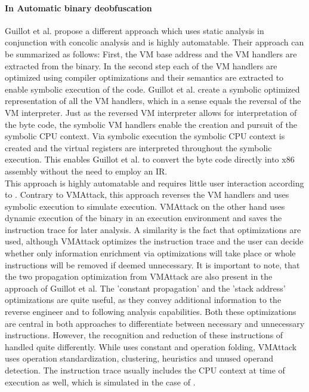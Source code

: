 \documentclass[10pt,twoside,a4paper,bibliography=totoc]{scrbook}
\begin{document}
\paragraph*{In Automatic binary deobfuscation} Guillot et al. propose a different approach which uses static analysis in conjunction with concolic analysis and is highly automatable.
Their approach can be summarized as follows: First, the VM base address and the VM handlers are extracted from the binary. 
In the second step each of the VM handlers are optimized using compiler optimizations and their semantics are extracted to enable symbolic execution of the code. 
Guillot et al. create a symbolic optimized representation of all the VM handlers, which in a sense equals the reversal of the VM interpreter. 
Just as the reversed VM interpreter allows for interpretation of the byte code, the symbolic VM handlers enable the creation and pursuit of the symbolic CPU context. 
Via symbolic execution the symbolic CPU context is created and the virtual registers are interpreted throughout the symbolic execution. 
This enables Guillot et al. to convert the byte code directly into x86 assembly without the need to employ an IR.\\
This approach is highly automatable and requires little user interaction according to \cite{guillot2010automatic}.
Contrary to VMAttack, this approach reverses the VM handlers and uses symbolic execution to simulate execution. 
VMAttack on the other hand uses dynamic execution of the binary in an execution environment and saves the instruction trace for later analysis. 
A similarity is the fact that optimizations are used, although VMAttack optimizes the instruction trace and the user can decide whether only information enrichment via optimizations will take place or whole instructions will be removed if deemed unnecessary. 
It is important to note, that the two propagation optimization from VMAttack are also present in the approach of Guillot et al. The 'constant propagation' and the 'stack address' optimizations are quite useful, as they convey additional information to the reverse engineer and to following analysis capabilities. Both these optimizations are central in both approaches to differentiate between necessary and unnecessary instructions.
However, the recognition and reduction of these instructions of handled quite differently. 
While \cite{guillot2010automatic} uses constant and operation folding, VMAttack uses operation standardization, clustering, heuristics and unused operand detection.
The instruction trace usually includes the CPU context at time of execution as well, which is simulated in the case of \cite{guillot2010automatic}.
\end{document}
